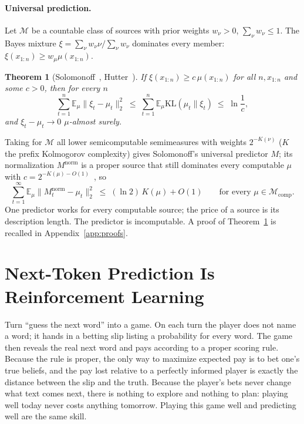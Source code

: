 \documentclass[11pt]{article}
\newtheorem{theorem}{Theorem}
\theoremstyle{definition}
\newcommand{\E}{\mathbb{E}}
\newcommand{\KL}{\mathrm{KL}}
\newcommand{\Mcomp}{\mathcal{M}_{\mathrm{comp}}}
\begin{document}
\paragraph{Universal prediction.} Let $\mathcal M$ be a countable class of sources with prior weights $w_\nu>0$, $\sum_\nu w_\nu\le1$. The Bayes mixture $\xi=\sum_\nu w_\nu\nu/\sum_\nu w_\nu$ dominates every member: $\xi(x_{1:n})\ge w_\mu\mu(x_{1:n})$.

\begin{theorem}[Solomonoff~\cite{solomonoff1978}, Hutter~\cite{hutter2001nonbinary}]\label{thm:hutter}
If $\xi(x_{1:n})\ge c\,\mu(x_{1:n})$ for all $n,x_{1:n}$ and some $c>0$, then for every $n$
\[
\sum_{t=1}^{n}\E_\mu\|\xi_t-\mu_t\|_2^2\;\le\;\sum_{t=1}^{n}\E_\mu\KL(\mu_t\|\xi_t)\;\le\;\ln\frac1c,
\]
and $\xi_t-\mu_t\to0$ $\mu$-almost surely.
\end{theorem}

\noindent Taking for $\mathcal M$ all lower semicomputable semimeasures with weights $2^{-K(\nu)}$ ($K$ the prefix Kolmogorov complexity) gives Solomonoff's universal predictor $M$; its normalization $M^{\mathrm{norm}}$ is a proper source that still dominates every computable $\mu$ with $c=2^{-K(\mu)-O(1)}$~\cite{livitanyi2019,leike2018computability}, so
\begin{equation}\label{eq:solomonoff}
\sum_{t=1}^{\infty}\E_\mu\|M^{\mathrm{norm}}_t-\mu_t\|_2^2\;\le\;(\ln2)\,K(\mu)+O(1)\qquad\text{for every }\mu\in\Mcomp.
\end{equation}
One predictor works for every computable source; the price of a source is its description length. The predictor is incomputable. A proof of Theorem~\ref{thm:hutter} is recalled in Appendix~\ref{app:proofs}.

\section{Next-Token Prediction Is Reinforcement Learning}\label{sec:reduction}

\begin{plain}
Turn ``guess the next word'' into a game. On each turn the player does not name a word; it hands in a betting slip listing a probability for every word. The game then reveals the real next word and pays according to a proper scoring rule. Because the rule is proper, the only way to maximize expected pay is to bet one's true beliefs, and the pay lost relative to a perfectly informed player is exactly the distance between the slip and the truth. Because the player's bets never change what text comes next, there is nothing to explore and nothing to plan: playing well today never costs anything tomorrow. Playing this game well and predicting well are the same skill.
\end{plain}
\end{document}
